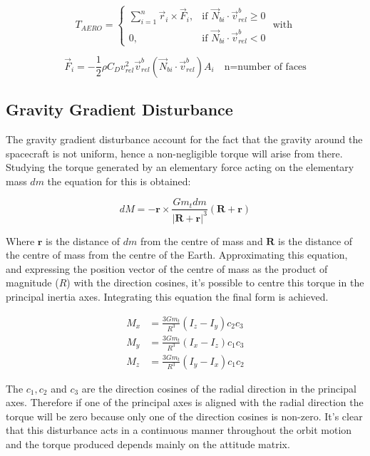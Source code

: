 \[
T_{AERO} =
\begin{cases}
	\sum_{i=1}^{n} \vec{r}_i \times \vec{F}_i, & \text{if } \vec{N}_{bi} \cdot \vec{v}^{b}_{rel} \geq 0 \\
	0, & \text{if } \vec{N}_{bi} \cdot \vec{v}^{b}_{rel} < 0
\end{cases}
\text{ with }
\]

\[
\vec{F}_i = -\frac{1}{2} \rho C_D v_{rel}^2 \vec{v}_{rel}^{b} (\vec{N}_{bi} \cdot \vec{v}_{rel}^{b}) A_i \quad \text{n=number of faces}
\]


\subsection{Gravity Gradient Disturbance}
\label{subsec:dist_GG}

The gravity gradient disturbance account for the fact that the gravity around the spacecraft is not uniform, hence a non-negligible torque 
will arise from there.
Studying the torque generated by an elementary force acting on the elementary mass \( dm \) the equation for this is obtained:

\begin{equation*}
	dM = -\mathbf{r} \times \frac{Gm_t dm}{|\mathbf{R} + \mathbf{r}|^3} (\mathbf{R} + \mathbf{r})
\end{equation*}

Where \( \mathbf{r} \) is the distance of \( dm \) from the centre of mass and \( \mathbf{R} \) is the distance of the centre of mass from the centre of the Earth. 
Approximating this equation, and expressing the position vector of the centre of mass as the product of magnitude (\( R \)) with the direction cosines, 
it’s possible to centre this torque in the principal inertia axes. Integrating this equation the final form is achieved.

\begin{align*}
	M_x &= \frac{3Gm_t}{R^3} (I_z - I_y)c_2c_3 \\
	M_y &= \frac{3Gm_t}{R^3} (I_x - I_z)c_1c_3 \\
	M_z &= \frac{3Gm_t}{R^3} (I_y - I_x)c_1c_2
\end{align*}

The \( c_1, c_2 \) and \( c_3 \) are the direction cosines of the radial direction in the principal axes. 
Therefore if one of the principal axes is aligned with the radial direction the torque will be zero because only one of the direction cosines is non-zero.
It's clear that this disturbance acts in a continuous manner throughout the orbit motion and the torque produced depends mainly on the attitude matrix.

